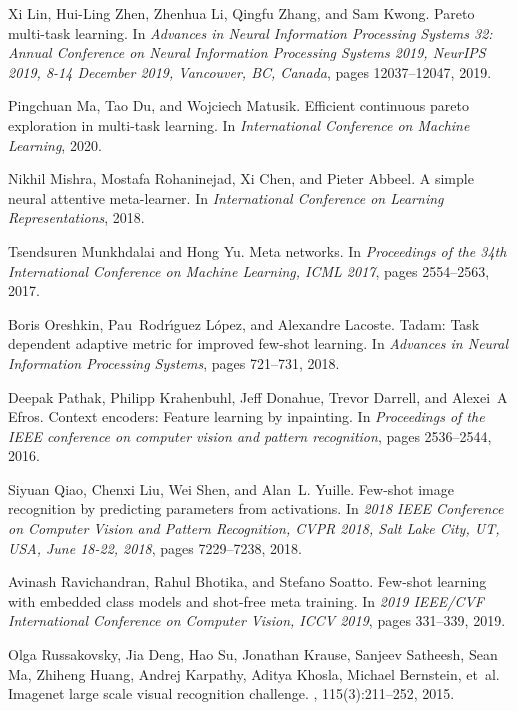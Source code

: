 \documentclass[final]{cvpr}
\begin{document}
\begin{thebibliography}{10}
	Xi Lin, Hui{-}Ling Zhen, Zhenhua Li, Qingfu Zhang, and Sam Kwong.
	\newblock Pareto multi-task learning.
	\newblock In {\em Advances in Neural Information Processing Systems 32: Annual
		Conference on Neural Information Processing Systems 2019, NeurIPS 2019, 8-14
		December 2019, Vancouver, BC, Canada}, pages 12037--12047, 2019.
	
	Pingchuan Ma, Tao Du, and Wojciech Matusik.
	\newblock Efficient continuous pareto exploration in multi-task learning.
	\newblock In {\em International Conference on Machine Learning}, 2020.
	
	Nikhil Mishra, Mostafa Rohaninejad, Xi Chen, and Pieter Abbeel.
	\newblock A simple neural attentive meta-learner.
	\newblock In {\em International Conference on Learning Representations}, 2018.
	
	Tsendsuren Munkhdalai and Hong Yu.
	\newblock Meta networks.
	\newblock In {\em Proceedings of the 34th International Conference on Machine
		Learning, {ICML} 2017}, pages 2554--2563, 2017.
	
	Boris Oreshkin, Pau~Rodr{\'\i}guez L{\'o}pez, and Alexandre Lacoste.
	\newblock Tadam: Task dependent adaptive metric for improved few-shot learning.
	\newblock In {\em Advances in Neural Information Processing Systems}, pages
	721--731, 2018.
	
	Deepak Pathak, Philipp Krahenbuhl, Jeff Donahue, Trevor Darrell, and Alexei~A
	Efros.
	\newblock Context encoders: Feature learning by inpainting.
	\newblock In {\em Proceedings of the IEEE conference on computer vision and
		pattern recognition}, pages 2536--2544, 2016.
	
	Siyuan Qiao, Chenxi Liu, Wei Shen, and Alan~L. Yuille.
	\newblock Few-shot image recognition by predicting parameters from activations.
	\newblock In {\em 2018 {IEEE} Conference on Computer Vision and Pattern
		Recognition, {CVPR} 2018, Salt Lake City, UT, USA, June 18-22, 2018}, pages
	7229--7238, 2018.
	
	Avinash Ravichandran, Rahul Bhotika, and Stefano Soatto.
	\newblock Few-shot learning with embedded class models and shot-free meta
	training.
	\newblock In {\em 2019 {IEEE/CVF} International Conference on Computer Vision,
		{ICCV} 2019}, pages 331--339, 2019.
	
	Olga Russakovsky, Jia Deng, Hao Su, Jonathan Krause, Sanjeev Satheesh, Sean Ma,
	Zhiheng Huang, Andrej Karpathy, Aditya Khosla, Michael Bernstein, et~al.
	\newblock Imagenet large scale visual recognition challenge.
	, 115(3):211--252,
	2015.
	

\end{thebibliography}
\end{document}
